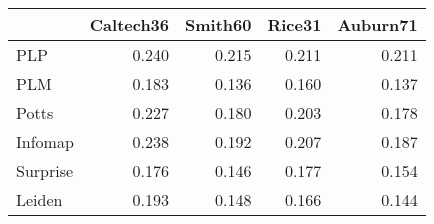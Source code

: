 \begin{tabular}{lrrrr}
\toprule
{} & Caltech36 & Smith60 & Rice31 & Auburn71 \\
\midrule
PLP      &     0.240 &   0.215 &  0.211 &    0.211 \\
PLM      &     0.183 &   0.136 &  0.160 &    0.137 \\
Potts    &     0.227 &   0.180 &  0.203 &    0.178 \\
Infomap  &     0.238 &   0.192 &  0.207 &    0.187 \\
Surprise &     0.176 &   0.146 &  0.177 &    0.154 \\
Leiden   &     0.193 &   0.148 &  0.166 &    0.144 \\
\bottomrule
\end{tabular}
